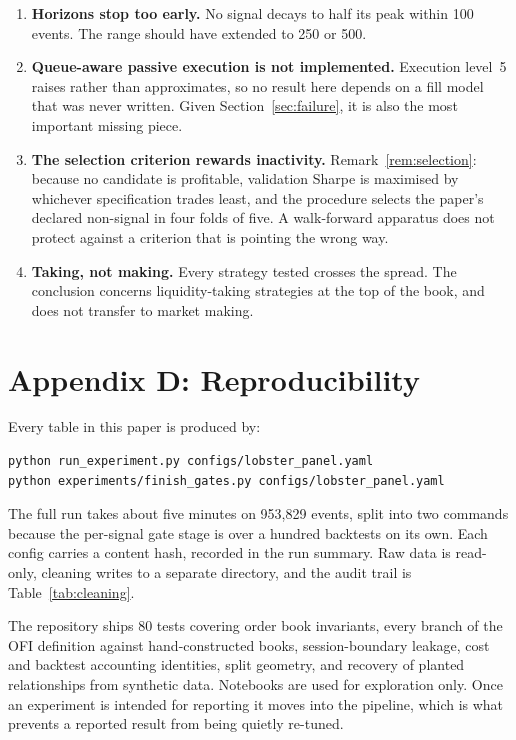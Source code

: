 \documentclass[11pt]{scrartcl}
\begin{document}
\begin{enumerate}
\item \textbf{Horizons stop too early.} No signal decays to half its peak within 100 events. The range should have extended to 250 or 500.

\item \textbf{Queue-aware passive execution is not implemented.} Execution level~5 raises rather than approximates, so no result here depends on a fill model that was never written. Given Section~\ref{sec:failure}, it is also the most important missing piece.

\item \textbf{The selection criterion rewards inactivity.} Remark~\ref{rem:selection}: because no candidate is profitable, validation Sharpe is maximised by whichever specification trades least, and the procedure selects the paper's declared non-signal in four folds of five. A walk-forward apparatus does not protect against a criterion that is pointing the wrong way.

\item \textbf{Taking, not making.} Every strategy tested crosses the spread. The conclusion concerns liquidity-taking strategies at the top of the book, and does not transfer to market making.
\end{enumerate}

\section{Appendix D: Reproducibility}
\label{sec:repro}

Every table in this paper is produced by:

\begin{lstlisting}[style=py, caption={Reproducing the full result set.}]
python run_experiment.py configs/lobster_panel.yaml
python experiments/finish_gates.py configs/lobster_panel.yaml
\end{lstlisting}

The full run takes about five minutes on 953{,}829 events, split into two commands because the per-signal gate stage is over a hundred backtests on its own. Each config carries a content hash, recorded in the run summary. Raw data is read-only, cleaning writes to a separate directory, and the audit trail is Table~\ref{tab:cleaning}.

The repository ships 80 tests covering order book invariants, every branch of the OFI definition against hand-constructed books, session-boundary leakage, cost and backtest accounting identities, split geometry, and recovery of planted relationships from synthetic data. Notebooks are used for exploration only. Once an experiment is intended for reporting it moves into the pipeline, which is what prevents a reported result from being quietly re-tuned.
\end{document}
